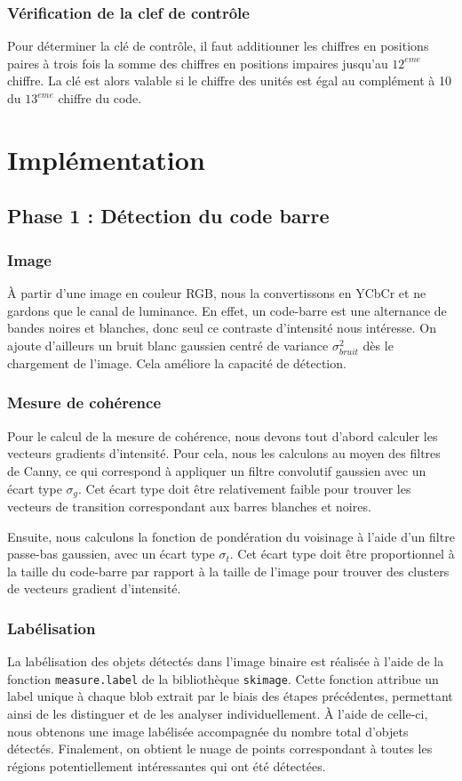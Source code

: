 \documentclass{rapport}
\begin{document}
\subsubsection*{Vérification de la clef de contrôle}
Pour déterminer la clé de contrôle, il faut additionner les chiffres en positions paires à trois fois la somme des
chiffres en positions impaires jusqu'au $12^{eme}$ chiffre. 
La clé est alors valable si le chiffre des unités est égal au complément à 10 du $13^{eme}$ chiffre du code.

\section{Implémentation}
\subsection{Phase 1 : Détection du code barre}
\subsubsection*{Image}
À partir d'une image en couleur RGB, nous la convertissons en YCbCr et ne gardons que le canal de luminance. En effet, un code-barre est une alternance de bandes noires et blanches, donc seul ce contraste d'intensité nous intéresse.
\newline On ajoute d'ailleurs un bruit blanc gaussien centré de variance $\sigma_{bruit}^2$ dès le chargement de l'image. Cela améliore la capacité de détection.

\subsubsection*{Mesure de cohérence}
\label{sec:coherence}
Pour le calcul de la mesure de cohérence, nous devons tout d'abord calculer les vecteurs gradients d'intensité. Pour cela, nous les calculons au moyen des filtres de Canny, ce qui correspond à appliquer un filtre convolutif gaussien avec un écart type $\sigma_g$. Cet écart type doit être relativement faible pour trouver les vecteurs de transition correspondant aux barres blanches et noires.

Ensuite, nous calculons la fonction de pondération du voisinage à l'aide d'un filtre passe-bas gaussien, avec un écart type $\sigma_t$. Cet écart type doit être proportionnel à la taille du code-barre par rapport à la taille de l'image pour trouver des clusters de vecteurs gradient d'intensité.

\subsubsection*{Labélisation}
La labélisation des objets détectés dans l'image binaire est réalisée à l'aide de la fonction \texttt{measure.label} de la bibliothèque \texttt{skimage}. Cette fonction attribue un label unique à chaque blob extrait par le biais des étapes précédentes, permettant ainsi de les distinguer et de les analyser individuellement. À l'aide de celle-ci, nous obtenons une image labélisée accompagnée du nombre total d'objets détectés. Finalement, on obtient le nuage de points correspondant à toutes les régions potentiellement intéressantes qui ont été détectées.
\end{document}
